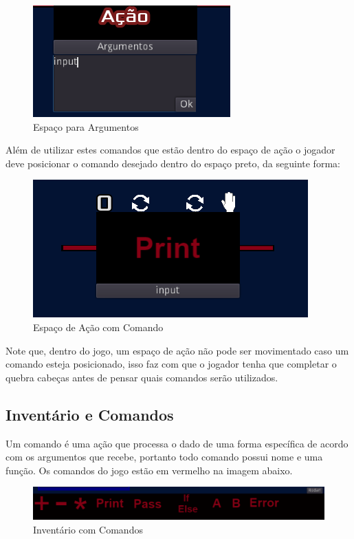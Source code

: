 \begin{figure}[H]
    \includegraphics[scale=0.6]{../figuras/argumentos.png}
    \caption{Espaço para Argumentos}
\end{figure}

Além de utilizar estes comandos que estão dentro do espaço de ação o jogador 
deve posicionar o comando desejado dentro do espaço preto, da seguinte forma:

\begin{figure}[H]
    \includegraphics[scale=0.6]{../figuras/espaco_com_comando.png}
    \caption{Espaço de Ação com Comando}
\end{figure}

Note que, dentro do jogo, um espaço de ação não pode ser movimentado caso um 
comando esteja posicionado, isso faz com que o jogador tenha que completar o
quebra cabeças antes de pensar quais comandos serão utilizados.

\subsection{Inventário e Comandos}

Um comando é uma ação que processa o dado de uma forma específica de acordo com
os argumentos que recebe, portanto todo comando possui nome e uma função.
Os comandos do jogo estão em vermelho na imagem abaixo.

\begin{figure}[H]
    \includegraphics[scale=0.5]{../figuras/inventario_comandos.png}
    \caption{Inventário com Comandos}
\end{figure}

